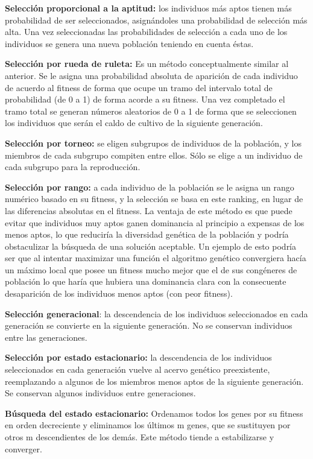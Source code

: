 \documentclass[
  a4paper,
  DIV=11,
  numbers=noendperiod]{scrreprt}
\begin{document}
\textbf{Selección proporcional a la aptitud:} los individuos más aptos
tienen más probabilidad de ser seleccionados, asignándoles una
probabilidad de selección más alta. Una vez seleccionadas las
probabilidades de selección a cada uno de los individuos se genera una
nueva población teniendo en cuenta éstas.

\textbf{Selección por rueda de ruleta:} Es un método conceptualmente
similar al anterior. Se le asigna una probabilidad absoluta de aparición
de cada individuo de acuerdo al fitness de forma que ocupe un tramo del
intervalo total de probabilidad (de 0 a 1) de forma acorde a su fitness.
Una vez completado el tramo total se generan números aleatorios de 0 a 1
de forma que se seleccionen los individuos que serán el caldo de cultivo
de la siguiente generación.

\textbf{Selección por torneo:} se eligen subgrupos de individuos de la
población, y los miembros de cada subgrupo compiten entre ellos. Sólo se
elige a un individuo de cada subgrupo para la reproducción.

\textbf{Selección por rango:} a cada individuo de la población se le
asigna un rango numérico basado en su fitness, y la selección se basa en
este ranking, en lugar de las diferencias absolutas en el fitness. La
ventaja de este método es que puede evitar que individuos muy aptos
ganen dominancia al principio a expensas de los menos aptos, lo que
reduciría la diversidad genética de la población y podría obstaculizar
la búsqueda de una solución aceptable. Un ejemplo de esto podría ser que
al intentar maximizar una función el algoritmo genético convergiera
hacía un máximo local que posee un fitness mucho mejor que el de sus
congéneres de población lo que haría que hubiera una dominancia clara
con la consecuente desaparición de los individuos menos aptos (con peor
fitness).

\textbf{Selección generacional}: la descendencia de los individuos
seleccionados en cada generación se convierte en la siguiente
generación. No se conservan individuos entre las generaciones.

\textbf{Selección por estado estacionario:} la descendencia de los
individuos seleccionados en cada generación vuelve al acervo genético
preexistente, reemplazando a algunos de los miembros menos aptos de la
siguiente generación. Se conservan algunos individuos entre
generaciones.

\textbf{Búsqueda del estado estacionario:} Ordenamos todos los genes por
su fitness en orden decreciente y eliminamos los últimos m genes, que se
sustituyen por otros m descendientes de los demás. Este método tiende a
estabilizarse y converger.
\end{document}
